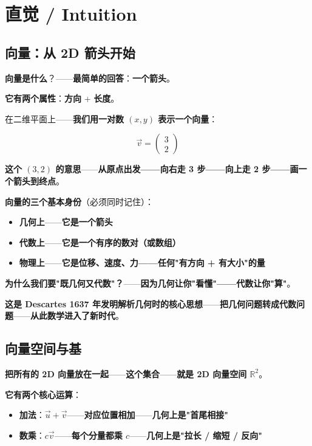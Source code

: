 \section{直觉 / Intuition}

\subsection{向量：从 2D 箭头开始}

\textbf{向量是什么}？——\textbf{最简单的回答}：\textbf{一个箭头}。

\textbf{它有两个属性}：\textbf{方向} + \textbf{长度}。

在二维平面上——\textbf{我们用一对数 $(x, y)$ 表示一个向量}：

\[
\vec{v} = \begin{pmatrix} 3 \\ 2 \end{pmatrix}
\]

\textbf{这个 $(3,2)$ 的意思}——\textbf{从原点出发——向右走 3 步——向上走 2 步——画一个箭头到终点}。

\textbf{向量的三个基本身份}（必须同时记住）：

\begin{itemize}
\item \textbf{几何上}——\textbf{它是一个箭头}
\item \textbf{代数上}——\textbf{它是一个有序的数对（或数组）}
\item \textbf{物理上}——\textbf{它是位移、速度、力——任何"有方向 + 有大小"的量}
\end{itemize}

\textbf{为什么我们要"既几何又代数"？}——\textbf{因为几何让你"看懂"——代数让你"算"}。

\textbf{这是 Descartes 1637 年发明解析几何时的核心思想}——\textbf{把几何问题转成代数问题}——\textbf{从此数学进入了新时代}。

\subsection{向量空间与基}

\textbf{把所有的 2D 向量放在一起}——\textbf{这个集合}——\textbf{就是 2D 向量空间 $\mathbb{R}^2$}。

\textbf{它有两个核心运算}：

\begin{itemize}
\item \textbf{加法}：$\vec{u} + \vec{v}$——\textbf{对应位置相加}——\textbf{几何上是"首尾相接"}
\item \textbf{数乘}：$c \vec{v}$——\textbf{每个分量都乘 $c$}——\textbf{几何上是"拉长 / 缩短 / 反向"}
\end{itemize}


